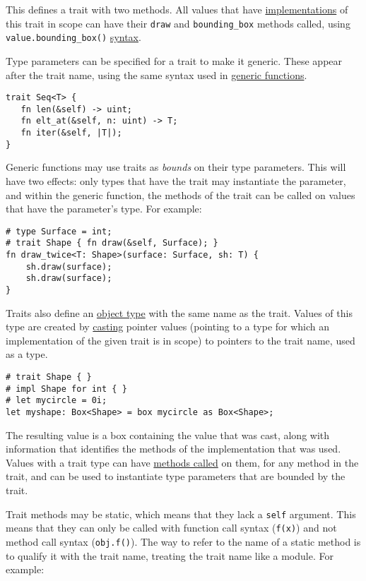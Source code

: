 \documentclass[]{article}
\begin{document}
This defines a trait with two methods. All values that have
\hyperref[implementations]{implementations} of this trait in scope can
have their \texttt{draw} and \texttt{bounding\_box} methods called,
using \texttt{value.bounding\_box()}
\hyperref[method-call-expressions]{syntax}.

Type parameters can be specified for a trait to make it generic. These
appear after the trait name, using the same syntax used in
\hyperref[generic-functions]{generic functions}.

\begin{verbatim}
trait Seq<T> {
   fn len(&self) -> uint;
   fn elt_at(&self, n: uint) -> T;
   fn iter(&self, |T|);
}
\end{verbatim}

Generic functions may use traits as \emph{bounds} on their type
parameters. This will have two effects: only types that have the trait
may instantiate the parameter, and within the generic function, the
methods of the trait can be called on values that have the parameter's
type. For example:

\begin{verbatim}
# type Surface = int;
# trait Shape { fn draw(&self, Surface); }
fn draw_twice<T: Shape>(surface: Surface, sh: T) {
    sh.draw(surface);
    sh.draw(surface);
}
\end{verbatim}

Traits also define an \hyperref[object-types]{object type} with the same
name as the trait. Values of this type are created by
\hyperref[type-cast-expressions]{casting} pointer values (pointing to a
type for which an implementation of the given trait is in scope) to
pointers to the trait name, used as a type.

\begin{verbatim}
# trait Shape { }
# impl Shape for int { }
# let mycircle = 0i;
let myshape: Box<Shape> = box mycircle as Box<Shape>;
\end{verbatim}

The resulting value is a box containing the value that was cast, along
with information that identifies the methods of the implementation that
was used. Values with a trait type can have
\hyperref[method-call-expressions]{methods called} on them, for any
method in the trait, and can be used to instantiate type parameters that
are bounded by the trait.

Trait methods may be static, which means that they lack a \texttt{self}
argument. This means that they can only be called with function call
syntax (\texttt{f(x)}) and not method call syntax (\texttt{obj.f()}).
The way to refer to the name of a static method is to qualify it with
the trait name, treating the trait name like a module. For example:
\end{document}
